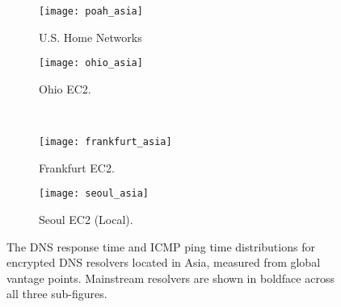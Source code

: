 \begin{figure*}[t!]
\centering
%
\begin{subfigure}[b]{0.4\textwidth}
\texttt{[image: poah\_asia]}
\caption{U.S. Home Networks}
\end{subfigure}
%
\begin{subfigure}[b]{0.4\textwidth}
\texttt{[image: ohio\_asia]}
\caption{Ohio EC2.}
\end{subfigure}
%
\hfill \\
\begin{subfigure}[b]{0.4\textwidth}
\texttt{[image: frankfurt\_asia]}
    \caption{Frankfurt EC2.}
\end{subfigure}
%
\begin{subfigure}[b]{0.4\textwidth}
\texttt{[image: seoul\_asia]}
    \caption{Seoul EC2 (Local).}
\end{subfigure}
\caption{The DNS response time and ICMP ping time distributions for
    encrypted DNS resolvers located in Asia, measured from global vantage points.
    Mainstream resolvers are shown in boldface across all three
    sub-figures.}
\label{fig:dns-asia}
\end{figure*}



